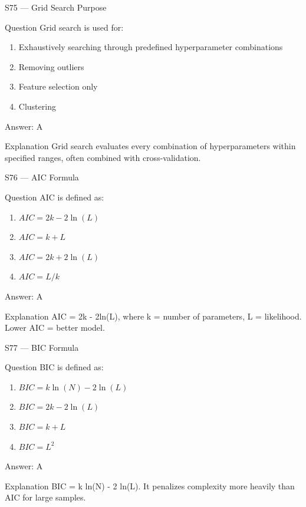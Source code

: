 \documentclass[aspectratio=169,8pt]{beamer}
\begin{document}
	\begin{frame}{S75 --- Grid Search Purpose}
		\begin{block}{Question}
			Grid search is used for:
			\begin{enumerate}
				\item Exhaustively searching through predefined hyperparameter combinations
				\item Removing outliers
				\item Feature selection only
				\item Clustering
			\end{enumerate}
		\end{block}
		\begin{exampleblock}{Answer: A}\end{exampleblock}
		\begin{block}{Explanation}
			Grid search evaluates every combination of hyperparameters within specified ranges, often combined with cross-validation.
		\end{block}
	\end{frame}
	
	\begin{frame}{S76 --- AIC Formula}
		\begin{block}{Question}
			AIC is defined as:
			\begin{enumerate}
				\item $AIC = 2k - 2\ln(L)$
				\item $AIC = k + L$
				\item $AIC = 2k + 2\ln(L)$
				\item $AIC = L/k$
			\end{enumerate}
		\end{block}
		\begin{exampleblock}{Answer: A}\end{exampleblock}
		\begin{block}{Explanation}
			AIC = 2k - 2ln(L), where k = number of parameters, L = likelihood. Lower AIC = better model.
		\end{block}
	\end{frame}
	
	\begin{frame}{S77 --- BIC Formula}
		\begin{block}{Question}
			BIC is defined as:
			\begin{enumerate}
				\item $BIC = k\ln(N) - 2\ln(L)$
				\item $BIC = 2k - 2\ln(L)$
				\item $BIC = k + L$
				\item $BIC = L^2$
			\end{enumerate}
		\end{block}
		\begin{exampleblock}{Answer: A}\end{exampleblock}
		\begin{block}{Explanation}
			BIC = k ln(N) - 2 ln(L). It penalizes complexity more heavily than AIC for large samples.
		\end{block}
	\end{frame}
	
\end{document}
